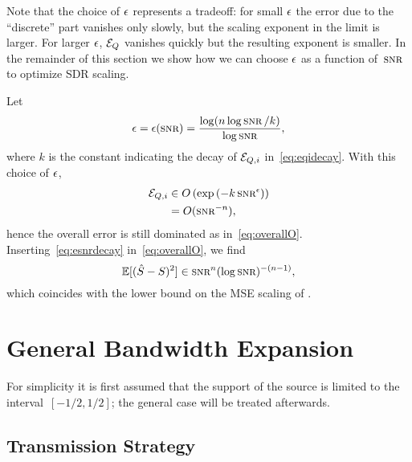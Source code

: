 Note that the choice of $\epsilon$ represents a tradeoff: for small $\epsilon$ the error due
to the ``discrete'' part vanishes only slowly, but the scaling exponent in the
limit is larger. For larger $\epsilon$, ${{\mathcal{E}}_Q}$ vanishes quickly but the resulting
exponent is smaller. In the remainder of this section we show how we can choose
$\epsilon$ as a function of~$\snr$ to optimize SDR scaling. 

Let
\begin{equation}
  \label{eq:esnrdecay}
  \e = \e(\snr) = \frac{\log(n \log\snr / k)}{\log\snr},
\end{equation}
where $k$ is the constant indicating the decay of ${{\mathcal{E}}_{Q,i}}$ in~\eqref{eq:eqidecay}.
With this choice of $\epsilon$,
\begin{align*}
  \Eqi &\in O\left( \exp\left( - k \snr^\e \right) \right) \\
 &= O(\snr^{-n}),
\end{align*}
hence the overall error is still dominated as in~\eqref{eq:overallO}.
Inserting~\eqref{eq:esnrdecay} in~\eqref{eq:overallO}, we find
\begin{equation*}
  \mse \in \snr^n (\log\snr)^{-(n-1)},
\end{equation*}
which coincides with the lower bound on the MSE scaling of .





\section{General Bandwidth Expansion}\label{sec:genbwexp}

For simplicity it is first assumed that the support of the source is limited to
the interval~$[-1/2, 1/2]$; the general case will be treated afterwards.

\subsection{Transmission Strategy}

